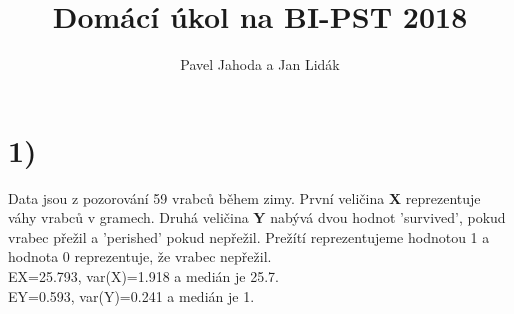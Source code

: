 \documentclass[12pt,a4paper]{article}
\begin{document}
\title{\LARGE \bf Domácí úkol na BI-PST 2018}
 \author{Pavel Jahoda a Jan Lidák}

\maketitle

\section{1)}
Data jsou z pozorování 59 vrabců během zimy. První veličina {\bf X} reprezentuje váhy vrabců v gramech. Druhá veličina {\bf Y} nabývá dvou hodnot 'survived', pokud vrabec přežil a 'perished' pokud nepřežil. Prežítí reprezentujeme hodnotou 1 a hodnota 0 reprezentuje, že vrabec nepřežil.\\
EX=25.793, var(X)=1.918 a medián je 25.7.\\
EY=0.593, var(Y)=0.241 a medián je 1.
\par \bigskip
\end{document}
